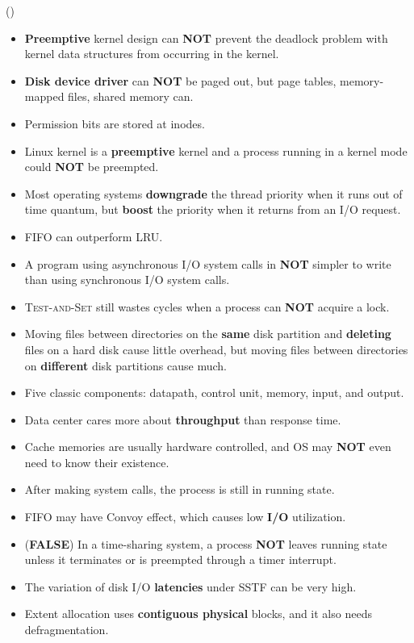\begin{theorem}{()}
\begin{itemize}
        \item \textbf{Preemptive} kernel design can \textbf{NOT} prevent the deadlock problem with kernel data structures from occurring in the kernel.
        \item \textbf{Disk device driver} can \textbf{NOT} be paged out, but page tables, memory-mapped files, shared memory can.
        \item Permission bits are stored at inodes.
        \item Linux kernel is a \textbf{preemptive} kernel and a process running in a kernel mode could \textbf{NOT} be preempted.
        \item Most operating systems \textbf{downgrade} the thread priority when it runs out of time quantum, but \textbf{boost} the priority when it returns from an I/O request.
        \item FIFO can outperform LRU.
        \item A program using asynchronous I/O system calls in \textbf{NOT} simpler to write than using synchronous I/O system calls.
        \item \textsc{Test-and-Set} still wastes cycles when a process can \textbf{NOT} acquire a lock. 
        \item Moving files between directories on the \textbf{same} disk partition and \textbf{deleting} files on a hard disk cause little overhead, but moving files between directories on \textbf{different} disk partitions cause much.
        \item Five classic components: datapath, control unit, memory, input, and output.
        \item Data center cares more about \textbf{throughput} than response time.
        \item Cache memories are usually hardware controlled, and OS may \textbf{NOT} even need to know their existence.
        \item After making system calls, the process is still in running state.
        \item FIFO may have Convoy effect, which causes low \textbf{I/O} utilization.
        \item (\textbf{FALSE}) In a time-sharing system, a process \textbf{NOT} leaves running state unless it terminates or is preempted through a timer interrupt. 
        \item The variation of disk I/O \textbf{latencies} under SSTF can be very high.
        \item Extent allocation uses \textbf{contiguous physical} blocks, and it also needs defragmentation.

\end{itemize}
\end{theorem}
